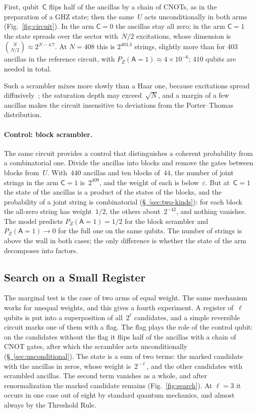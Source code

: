 \documentclass[11pt,a4paper]{article}
\newcommand{\qC}{\mathsf{C}}
\newcommand{\qA}{\mathsf{A}}
\newcommand{\CollapseRuleD}{the Threshold Rule}
\begin{document}
First, qubit~$\qC$ flips half of the ancillas by a chain of CNOTs, as in the preparation of a GHZ state; then the same~$U$ acts unconditionally in both arms (Fig.~\ref{fig:circuit}). In the arm $\qC=0$ the ancillas stay all zero; in the arm $\qC=1$ the state spreads over the sector with~$N/2$ excitations, whose dimension is $\binom{N}{N/2}\approx2^{N-4.7}$. At $N=408$ this is $2^{403.3}$ strings, slightly more than for $403$ ancillas in the reference circuit, with $P_Z(\qA{=}1)\approx4\times10^{-6}$; $410$ qubits are needed in total.

Such a scrambler mixes more slowly than a Haar one, because excitations spread diffusively~\cite{khemani2018,rakovszky2018}; the saturation depth may exceed~$\sqrt N$, and a margin of a few ancillas makes the circuit insensitive to deviations from the Porter--Thomas distribution.

\paragraph{Control: block scrambler.}
The same circuit provides a control that distinguishes a coherent probability from a combinatorial one. Divide the ancillas into blocks and remove the gates between blocks from~$U$. With~$440$ ancillas and ten blocks of~$44$, the number of joint strings in the arm $\qC=1$ is~$2^{409}$, and the weight of each is below~$\varepsilon$. But at~$\qC=1$ the state of the ancillas is a product of the states of the blocks, and the probability of a joint string is combinatorial (\hyperref[sec:two-kinds]{\S~\ref*{sec:two-kinds}}): for each block the all-zero string has weight~$1/2$, the others about~$2^{-42}$, and nothing vanishes. The model predicts $P_Z(\qA{=}1)=1/2$ for the block scrambler and $P_Z(\qA{=}1)\to0$ for the full one on the same qubits. The number of strings is above the wall in both cases; the only difference is whether the state of the arm decomposes into factors.

\subsection{Search on a Small Register}
\label{sec:small-search}

The marginal test is the case of two arms of equal weight. The same mechanism works for unequal weights, and this gives a fourth experiment. A register of~$\ell$ qubits is put into a superposition of all~$2^\ell$ candidates, and a simple reversible circuit marks one of them with a flag. The flag plays the role of the control qubit: on the candidates without the flag it flips half of the ancillas with a chain of CNOT gates, after which the scrambler acts unconditionally (\hyperref[sec:unconditional]{\S~\ref*{sec:unconditional}}). The state is a sum of two terms: the marked candidate with the ancillas in zeros, whose weight is~$2^{-\ell}$, and the other candidates with scrambled ancillas. The second term vanishes as a whole, and after renormalization the marked candidate remains (Fig.~\ref{fig:search}). At $\ell=3$ it occurs in one case out of eight by standard quantum mechanics, and almost always by \CollapseRuleD{}.
\end{document}
